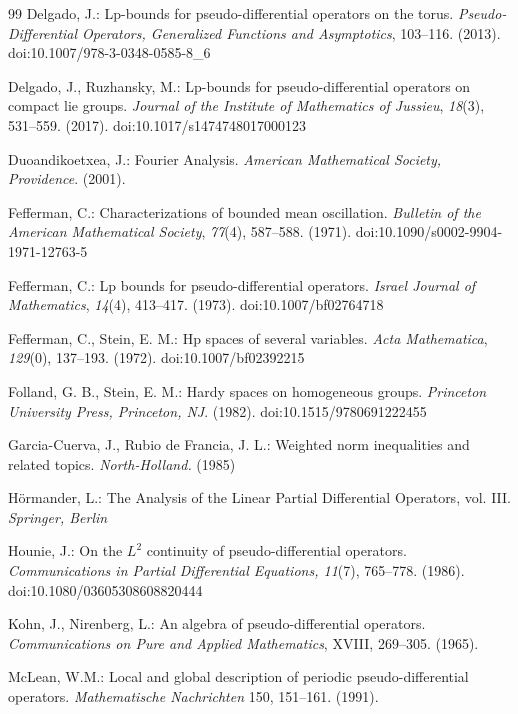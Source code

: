\documentclass[12pt, reqno]{amsart}
\theoremstyle{definition}
\theoremstyle{remark}
\numberwithin{equation}{section}
\begin{document}
\begin{thebibliography}{99}
Delgado, J.: Lp-bounds for pseudo-differential operators on the torus. \textit{Pseudo-Differential Operators, Generalized Functions and Asymptotics}, 103–116. (2013). doi:10.1007/978-3-0348-0585-8\_6 


Delgado, J.,  Ruzhansky, M.: Lp-bounds for pseudo-differential operators on compact lie groups. \textit{Journal of the Institute of Mathematics of Jussieu}, \textit{18}(3), 531–559. (2017). doi:10.1017/s1474748017000123 


Duoandikoetxea, J.: Fourier Analysis. \textit{American Mathematical Society, Providence}. (2001).



Fefferman, C.: Characterizations of bounded mean oscillation. \textit{Bulletin of the American Mathematical Society}, \textit{77}(4), 587–588. (1971). doi:10.1090/s0002-9904-1971-12763-5 


Fefferman, C.: Lp bounds for pseudo-differential operators. \textit{Israel Journal of Mathematics}, \textit{14}(4), 413–417. (1973). doi:10.1007/bf02764718 


Fefferman, C.,  Stein, E. M.: Hp spaces of several variables. \textit{Acta Mathematica}, \textit{129}(0), 137–193. (1972). doi:10.1007/bf02392215 


Folland, G. B.,  Stein, E. M.: Hardy spaces on homogeneous groups. \textit{Princeton University Press, Princeton, NJ}. (1982). doi:10.1515/9780691222455 

Garcia-Cuerva, J., Rubio de Francia, J. L.: Weighted norm inequalities and related topics. \textit{North-Holland.} (1985)

Hörmander, L.: The Analysis of the Linear Partial Differential Operators, vol. III.  \textit{Springer, Berlin}


Hounie, J.: On the $L^2$ continuity of pseudo-differential operators. \textit{Communications in Partial Differential Equations, 11}(7), 765–778. (1986). doi:10.1080/03605308608820444 



Kohn, J., Nirenberg, L.: {An algebra of pseudo-differential operators}. \textit{Communications on Pure and Applied Mathematics},
XVIII, 269–305. (1965).

McLean, W.M.: Local and global description of periodic pseudo-differential operators. \textit{Mathematische Nachrichten}
150, 151–161. (1991).


\end{thebibliography}
\end{document}
